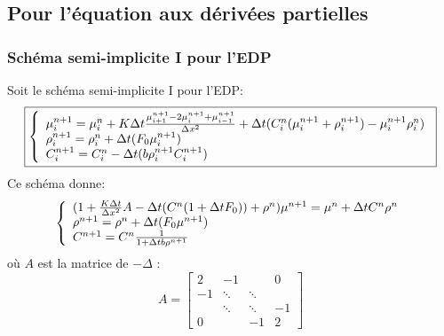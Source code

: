 \subsection{Pour l'équation aux dérivées partielles}
\subsubsection{Schéma semi-implicite I pour l'EDP}
Soit le schéma semi-implicite I pour l'EDP:
\begin{equation} \boxed{\left\{
                \begin{array}{ll}
                   \mu^{n+1}_i = \mu^{n}_i+ K\Delta t \frac{\mu^{n+1}_{i+1}-2\mu^{n+1}_i+\mu^{n+1}_{i-1}}{\Delta x ^2} + \Delta t( C^{n}_i(\mu^{n+1}_i + \rho^{n+1}_i) -\mu^{n+1}_i\rho^{n}_i)\\
                \rho^{n+1}_i=  \rho^{n}_i+ \Delta t (F_0 \mu^{n+1}_i) \\
                 C^{n+1}_i =C^{n}_i- \Delta t(b\rho^{n+1}_iC^{n+1}_i)
                \end{array}
              \right.}
\end{equation}
Ce schéma donne:
\begin{equation*} \left\{
                \begin{array}{ll}
                   (1+\frac{K\Delta t}{\Delta x^2}A-\Delta t(C^{n}(1+\Delta t F_0)) + \rho^{n})\mu^{n+1} = \mu^{n}+  \Delta t C^{n}\rho^{n} \\
                \rho^{n+1}=  \rho^{n}+ \Delta t (F_0 \mu^{n+1}) \\
                 C^{n+1} = C^{n}\frac{1}{1+ \Delta t b\rho^{n+1}}
                \end{array}
              \right.
\end{equation*}
où $A$ est la matrice de $-\Delta$
:\begin{equation}  \label{myeq}A= \left[ \begin{matrix}2 & -1 & & 0\\-1 & \ddots & \ddots &  \\& \ddots & \ddots &  -1 \\0 &  & -1 & 2  \end{matrix}  \right]\end{equation}
